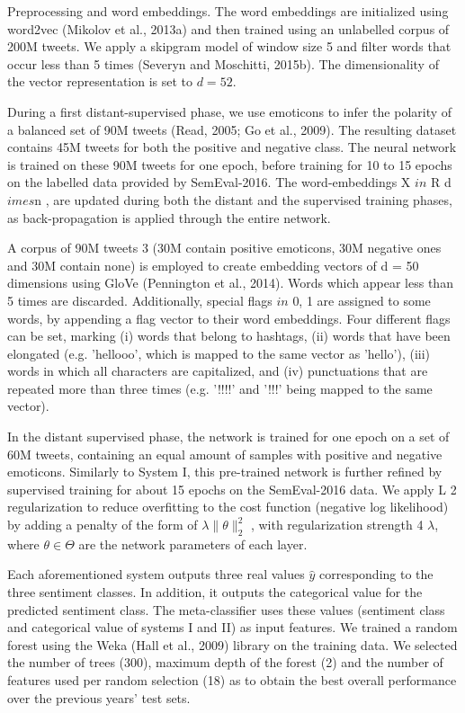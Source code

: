 Preprocessing and word embeddings.  The word embeddings are
initialized using word2vec (Mikolov et al., 2013a) and then trained
using an unlabelled corpus of 200M tweets. We apply a skipgram model
of window size 5 and filter words that occur less than 5 times
(Severyn and Moschitti, 2015b). The dimensionality of the vector
representation is set to $d = 52$.

During a first distant-supervised phase, we use emoticons to infer the
polarity of a balanced set of 90M tweets (Read, 2005; Go et al.,
2009).  The resulting dataset contains 45M tweets for both the
positive and negative class. The neural network is trained on these
90M tweets for one epoch, before training for 10 to 15 epochs on the
labelled data provided by SemEval-2016. The word-embeddings X $in$ R
d$ imes$n , are updated during both the distant and the supervised
training phases, as back-propagation is applied through the entire
network.

A corpus of 90M tweets 3 (30M contain positive emoticons, 30M negative
ones and 30M contain none) is employed to create embedding vectors
of d = 50 dimensions using GloVe (Pennington et al., 2014).  Words
which appear less than 5 times are discarded.  Additionally, special
flags $in$ {0, 1} are assigned to some words, by appending a flag vector
to their word embeddings. Four different flags can be set, marking
(i) words that belong to hashtags, (ii) words that have been elongated
(e.g. 'hellooo', which is mapped to the same vector as 'hello'), (iii)
words in which all characters are capitalized, and (iv) punctuations
that are repeated more than three times (e.g.  '!!!!' and '!!!' being
mapped to the same vector).

In the distant supervised phase, the network is trained for one
epoch on a set of 60M tweets, containing an equal amount of samples
with positive and negative emoticons. Similarly to System I, this
pre-trained network is further refined by supervised training for
about 15 epochs on the SemEval-2016 data. We apply L 2 regularization
to reduce overfitting to the cost function (negative log likelihood)
by adding a penalty of the form of $\lambda\lVert \theta \rVert^2_2$ ,
with regularization strength 4 $\lambda$, where $\theta \in\Theta$
are the network parameters of each layer.

Each aforementioned system outputs three real values $\hat{y}$
corresponding to the three sentiment classes.  In addition, it outputs
the categorical value for the predicted sentiment class. The
meta-classifier uses these values (sentiment class and categorical
value of systems I and II) as input features. We trained a random
forest using the Weka (Hall et al., 2009) library on the training
data. We selected the number of trees (300), maximum depth of the
forest (2) and the number of features used per random selection (18)
as to obtain the best overall performance over the previous years'
test sets.

